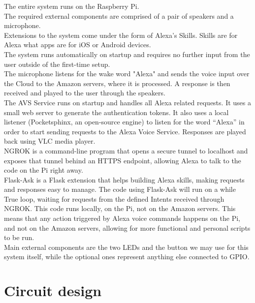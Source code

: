 \documentclass[a4paper,11pt]{article}
\begin{document}
The entire system runs on the Raspberry Pi.\\

The required external components are comprised of a pair of speakers and a microphone. \\

Extensions to the system come under the form of Alexa's Skills. Skills are for Alexa what apps are for iOS or Android devices.\\

The system runs automatically on startup and requires no further input from the user outside of the first-time setup.\\

The microphone listens for the wake word "Alexa" and sends the voice input over the Cloud to the Amazon servers, where it is processed. A response is then received and played to the user through the speakers.\\

The AVS Service runs on startup and handles all Alexa related requests. It uses a small web server to generate the authentication tokens. It also uses a local listener (Pocketsphinx, an open-source engine) to listen for the word “Alexa” in order to start sending requests to the Alexa Voice Service. Responses are played back using VLC media player.\\

NGROK is a command-line program that opens a secure tunnel to localhost and exposes that tunnel behind an HTTPS endpoint, allowing Alexa to talk to the code on the Pi right away. \\

Flask-Ask is a Flask extension that helps building Alexa skills, making requests and responses easy to manage. The code using Flask-Ask will run on a while True loop, waiting for requests from the defined Intents received through NGROK. This code runs locally, on the Pi, not on the Amazon servers.
This means that any action triggered by Alexa voice commands happens on the Pi, and not on the Amazon servers, allowing for more functional and personal scripts to be run.\\

Main external components are the two LEDs and the button we may use for this system itself, while the optional ones represent anything else connected to GPIO.\\



\section{Circuit design}
\end{document}

